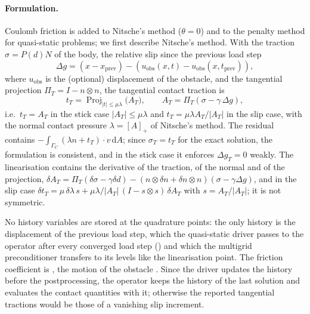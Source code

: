 \documentclass[11pt,a4paper]{article}
\newcommand{\dd}{\,\mathrm{d}}
\begin{document}
\paragraph{Formulation.}
Coulomb friction is added to Nitsche's method ($\theta=0$) and to the penalty method for
quasi-static problems; we first describe Nitsche's method. With the
traction $\sigma=P(d)N$ of the body, the relative slip since the previous load step
\begin{equation}
  \Delta g = (x - x_{\mathrm{prev}}) - (u_{\mathrm{obs}}(x,t)-u_{\mathrm{obs}}(x,t_{\mathrm{prev}})),
\end{equation}
where $u_{\mathrm{obs}}$ is the (optional) displacement of the obstacle, and the tangential
projection $\Pi_T = I - n\otimes n$, the tangential contact traction is
\begin{equation}
  t_T = \operatorname{Proj}_{|t|\le\mu\lambda}\bigl(A_T\bigr), \qquad
  A_T = \Pi_T(\sigma - \gamma\,\Delta g),
\end{equation}
i.e.\ $t_T = A_T$ in the stick case $|A_T|\le\mu\lambda$ and $t_T = \mu\lambda A_T/|A_T|$ in the
slip case, with the normal contact pressure $\lambda = [A]_+$ of Nitsche's method.
The residual contains $-\int_{\Gamma_C}(\lambda n + t_T)\cdot v\dd A$; since
$\sigma_T = t_T$ for the exact solution, the formulation is consistent, and in the stick case it
enforces $\Delta g_T = 0$ weakly. The linearisation contains the derivative of the traction, of
the normal and of the projection,
$\delta A_T = \Pi_T(\delta\sigma - \gamma\delta d) - (n\otimes\delta n + \delta n\otimes n)(\sigma-\gamma\Delta g)$,
and in the slip case
$\delta t_T = \mu\,\delta\lambda\, s + \mu\lambda/|A_T|\,(I - s\otimes s)\,\delta A_T$ with
$s = A_T/|A_T|$; it is not symmetric.

No history variables are stored at the quadrature points: the only history is the displacement of
the previous load step, which the quasi-static driver passes to the operator after every converged
load step () and which the multigrid
preconditioner transfers to its levels like the linearisation point. The friction coefficient is
, the motion of the obstacle
. Since the driver updates the history
before the postprocessing, the operator keeps the history of the last solution and evaluates the
contact quantities with it; otherwise the reported tangential tractions would be those of a
vanishing slip increment.
\end{document}
